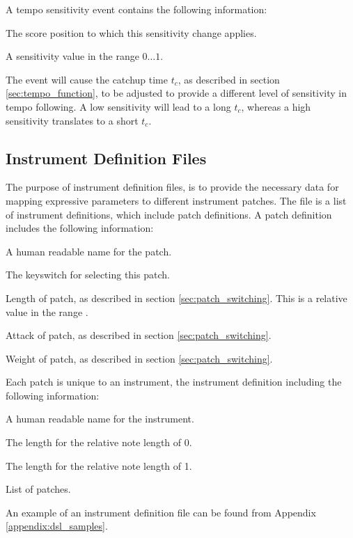 A tempo sensitivity event contains the following information:
\begin{description}[leftmargin=16ex]
\item[Position] The score position to which this sensitivity change applies.
\item[Sensitivity] A sensitivity value in the range $0 \ldots 1$.
\end{description}
The event will cause the catchup time $t_c$,
as described in section \ref{sec:tempo_function},
to be adjusted to provide a different level of sensitivity in tempo following.
A low sensitivity will lead to a long $t_c$,
whereas a high sensitivity translates to a short $t_c$.


\subsection{Instrument Definition Files}
\label{sec:instrument_definition_format}

The purpose of instrument definition files,
is to provide the necessary data for
mapping expressive parameters to different
instrument patches.
The file is a list of instrument definitions,
which include patch definitions.
A patch definition includes the following information:
\begin{description}[leftmargin=24ex]
\item[Name] A human readable name for the patch.
\item[Keyswitch] The keyswitch for selecting this patch.
\item[Length] Length of patch, as described in section \ref{sec:patch_switching}.
This is a relative value in the range .
\item[Attack] Attack of patch, as described in section \ref{sec:patch_switching}.
\item[Weight] Weight of patch, as described in section \ref{sec:patch_switching}.
\end{description}
Each patch is unique to an instrument,
the instrument definition including the following information:
\begin{description}[leftmargin=24ex]
\item[Name] A human readable name for the instrument.
\item[Shortest note] The length for the relative note length of 0.
\item[Longest note] The length for the relative note length of 1.
\item[Patches] List of patches.
\end{description}
An example of an instrument definition file can be found from Appendix
\ref{appendix:dsl_samples}.

